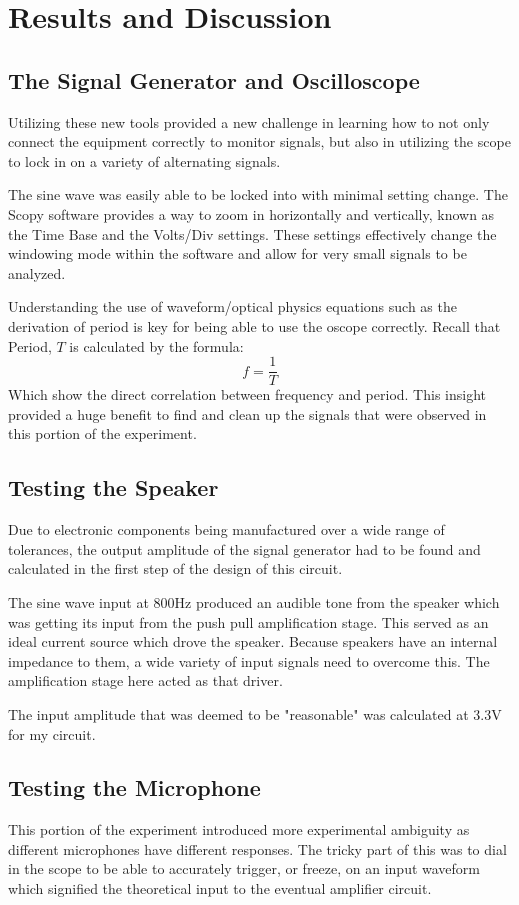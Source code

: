 \documentclass[12pt]{article}
\begin{document}
\section{Results and Discussion}
\subsection{The Signal Generator and Oscilloscope}
Utilizing these new tools provided a new challenge in learning how to not only
connect the equipment correctly to monitor signals, but also in utilizing the
scope to lock in on a variety of alternating signals.

The sine wave was easily able to be locked into with minimal setting change. The
Scopy software provides a way to zoom in horizontally and vertically, known as
the Time Base and the Volts/Div settings. These settings effectively change the
windowing mode within the software and allow for very small signals to be
analyzed.

Understanding the use of waveform/optical physics equations such as the
derivation of period is key for being able to use the oscope correctly. Recall
that Period, \(T\) is calculated by the formula:
\[
	f = \frac{1}{T}
\]
Which show the direct correlation between frequency and period. This insight
provided a huge benefit to find and clean up the signals that were observed in
this portion of the experiment.
\subsection{Testing the Speaker}
Due to electronic components being manufactured over a wide range of tolerances,
the output amplitude of the signal generator had to be found and calculated in
the first step of the design of this circuit.

The sine wave input at 800Hz produced an audible tone from the speaker which was
getting its input from the push pull amplification stage. This served as an
ideal current source which drove the speaker. Because speakers have an internal
impedance to them, a wide variety of input signals need to overcome this. The
amplification stage here acted as that driver.

The input amplitude that was deemed to be "reasonable" was calculated at 3.3V
for my circuit.
\subsection{Testing the Microphone}
This portion of the experiment introduced more experimental ambiguity as
different microphones have different responses. The tricky part of this was to
dial in the scope to be able to accurately trigger, or freeze, on an input
waveform which signified the theoretical input to the eventual amplifier
circuit.
\end{document}
